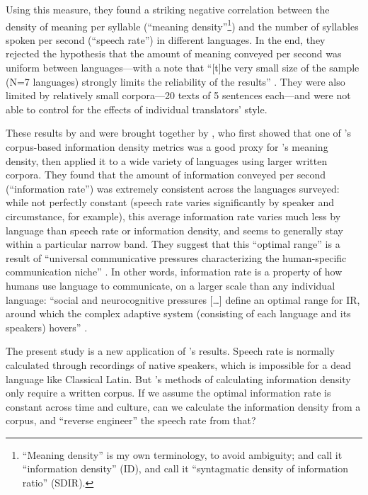\documentclass[12pt,twoside]{article}
\begin{document}
Using this measure, they found a striking negative correlation between the density of meaning per syllable (``meaning density''\footnote{``Meaning density'' is my own terminology, to avoid ambiguity; \citet{pellegrino} and \citet{oh} call it ``information density'' (ID), and \citet{coupé} call it ``syntagmatic density of information ratio'' (SDIR).}) and the number of syllables spoken per second (``speech rate'') in different languages. In the end, they rejected the hypothesis that the amount of meaning conveyed per second was uniform between languages---with a note that ``[t]he very small size of the sample (N=7 languages) strongly limits the reliability of the results'' \citep[550]{pellegrino}. They were also limited by relatively small corpora---20 texts of 5 sentences each---and were not able to control for the effects of individual translators' style.

These results by \citet{oh} and \citet{pellegrino} were brought together by \citet{coupé}, who first showed that one of \citeauthor{oh}'s corpus-based information density metrics was a good proxy for \citeauthor{pellegrino}'s meaning density, then applied it to a wide variety of languages using larger written corpora. They found that the amount of information conveyed per second (``information rate'') was extremely consistent across the languages surveyed: while not perfectly constant (speech rate varies significantly by speaker and circumstance, for example), this average information rate varies much less by language than speech rate or information density, and seems to generally stay within a particular narrow band. They suggest that this ``optimal range'' is a result of ``universal communicative pressures characterizing the human-specific communication niche'' \citep[6]{coupé}. In other words, information rate is a property of how humans use language to communicate, on a larger scale than any individual language: ``social and neurocognitive pressures [\ldots] define an optimal range for IR, around which the complex adaptive system (consisting of each language and its speakers) hovers'' \citep[6]{coupé}.

The present study is a new application of \citeauthor{coupé}'s results. Speech rate is normally calculated through recordings of native speakers, which is impossible for a dead language like Classical Latin. But \citeauthor{oh}'s methods of calculating information density only require a written corpus. If we assume the optimal information rate is constant across time and culture, can we calculate the information density from a corpus, and ``reverse engineer'' the speech rate from that?
\end{document}
